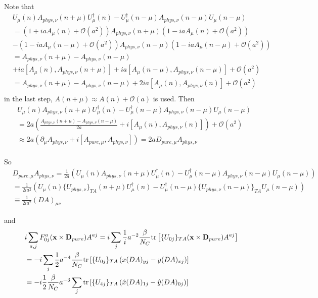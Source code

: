 Note that
\begin{equation}
\begin{split}
&U_{\mu}(n)A_{phys,\nu}(n+\mu)U^{\dagger}_{\mu}(n)-U^{\dagger}_{\mu}(n-\mu)A_{phys,\nu}(n-\mu)U_{\mu}(n-\mu)\\
&=\left(1+iaA_{\mu}(n)+\mathcal{O}(a^2)\right)A_{phys,\nu}(n+\mu)\left(1-iaA_{\mu}(n)+\mathcal{O}(a^2)\right)\\
&-\left(1-iaA_{\mu}(n-\mu)+\mathcal{O}(a^2)\right)A_{phys,\nu}(n-\mu)\left(1-iaA_{\mu}(n-\mu)+\mathcal{O}(a^2)\right)\\
&=A_{phys,\nu}(n+\mu)-A_{phys,\nu}(n-\mu)\\
&+ia\left[A_{\mu}(n),A_{phys,\nu}(n+\mu)\right]+ia[A_{\mu}(n-\mu), A_{phys,\nu}(n-\mu)]+\mathcal{O}(a^2)\\
&=A_{phys,\nu}(n+\mu)-A_{phys,\nu}(n-\mu)+2ia\left[A_{\mu}(n),A_{phys,\nu}(n)\right]+\mathcal{O}(a^2)\\
\end{split}
\end{equation}
in the last step, $A(n+\mu)\approx A(n)+\mathcal{O}(a)$ is used. Then
\begin{equation}
\begin{split}
&U_{\mu}(n)A_{phys,\nu}(n+\mu)U^{\dagger}_{\mu}(n)-U^{\dagger}_{\mu}(n-\mu)A_{phys,\nu}(n-\mu)U_{\mu}(n-\mu)\\
&=2a\left(\frac{A_{phys,\nu}(n+\mu)-A_{phys,\nu}(n-\mu)}{2a}+i\left[A_{\mu}(n),A_{phys,\nu}(n)\right]\right)+\mathcal{O}(a^2)\\
&\approx 2a \left(\partial _{\mu}A_{phys,\nu}+i\left[A_{pure,\mu},A_{phys,\nu}\right]\right)=2aD_{pure,\mu}A_{phys,\nu}\\
\end{split}
\end{equation}

So
\begin{equation}
\begin{split}
&D_{pure,\mu}A_{phys,\nu}=\frac{1}{2a}\left(U_{\mu}(n)A_{phys,\nu}(n+\mu)U^{\dagger}_{\mu}(n)-U^{\dagger}_{\mu}(n-\mu)A_{phys,\nu}(n-\mu)U_{\mu}(n-\mu)\right)\\
&=\frac{1}{2ia^2}\left(U_{\mu}(n)\{U_{phys,\nu}\}_{TA}(n+\mu)U^{\dagger}_{\mu}(n)-U^{\dagger}_{\mu}(n-\mu)\{U_{phys,\nu}(n-\mu)\}_{TA}U_{\mu}(n-\mu)\right)\\
&\equiv \frac{1}{2ia^2} (DA)_{\mu\nu}
\end{split}
\end{equation}

and
\begin{equation}
\begin{split}
&i\sum _{a,j}F^a_{0j}({\bf x}\times {\bf D}_{pure})A^{aj}=i\sum _j\frac{1}{i}a^{-2}\frac{\beta}{N_C}{\rm tr}\left[\{U_{0j}\}_{TA}({\bf x}\times {\bf D}_{pure})A^{aj}\right]\\
&=-i\sum _j\frac{1}{2}a^{-4}\frac{\beta}{N_C}{\rm tr}\left[\{U_{0j}\}_{TA}\left(x (DA)_{y j} - y (DA)_{x j}\right)\right]\\
&=-i\frac{1}{2}\frac{\beta}{N_C} a^{-3}\sum _j{\rm tr}\left[\{U_{4j}\}_{TA}\left(\hat{x} (DA)_{1 j} - \hat{y} (DA)_{0 j}\right)\right]\\
\end{split}
\end{equation}


